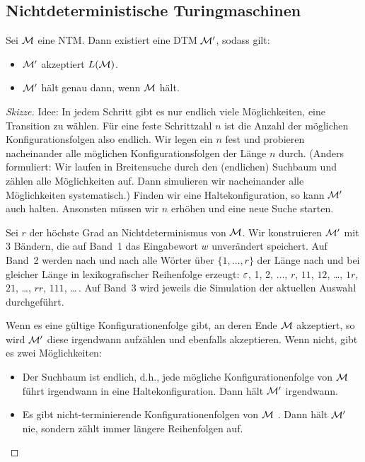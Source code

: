 \subsection{Nichtdeterministische Turingmaschinen}

\begin{Satz}
	Sei $\mathcal{M}$ eine \ac{NTM}.
	Dann existiert eine \ac{DTM} $\mathcal{M}'$, sodass gilt:
	\begin{itemize}
	\item $\mathcal{M}'$ akzeptiert $L(\mathcal{M})$.
	\item $\mathcal{M}'$ hält genau dann, wenn $\mathcal{M}$ hält.
	\qedhere
	\end{itemize}
\end{Satz}

\begin{proof}[Skizze]
Idee: In jedem Schritt gibt es nur endlich viele Möglichkeiten, eine Transition zu wählen.
Für eine feste Schrittzahl $n$ ist die Anzahl der möglichen Konfigurationsfolgen also endlich.
Wir legen ein $n$ fest und probieren nacheinander alle möglichen Konfigurationsfolgen der Länge $n$ durch.
(Anders formuliert: Wir laufen in Breitensuche durch den (endlichen) Suchbaum und zählen alle Möglichkeiten auf.
Dann simulieren wir nacheinander alle Möglichkeiten systematisch.)
Finden wir eine Haltekonfiguration, so kann $\mathcal{M}'$ auch halten.
Ansonsten müssen wir $n$ erhöhen und eine neue Suche starten.

Sei $r$ der höchste Grad an Nichtdeterminismus von $\mathcal{M}$.
Wir konstruieren $\mathcal{M}'$ mit 3 Bändern, die auf Band~1 das Eingabewort $w$ unverändert speichert.
Auf Band~2 werden nach und nach alle Wörter über $\{1, \dots, r\}$ der Länge nach und bei gleicher Länge in lexikografischer Reihenfolge erzeugt: $\varepsilon$, 1, 2, $\dots$, $r$, $11$, $12$, \dots, $1r$, $21$, \dots, $rr$, $111$, \dots\,.
Auf Band~3 wird jeweils die Simulation der aktuellen Auswahl durchgeführt.

Wenn es eine gültige Konfigurationenfolge gibt, an deren Ende $\mathcal{M}$ akzeptiert, so wird $\mathcal{M}'$ diese irgendwann aufzählen und ebenfalls akzeptieren.
Wenn nicht, gibt es zwei Möglichkeiten:
%
\begin{itemize}
 \item Der Suchbaum ist endlich, d.h., jede mögliche Konfigurationenfolge von $\mathcal{M}$ führt irgendwann in eine Haltekonfiguration.
 Dann hält $\mathcal{M}'$ irgendwann.
 \item Es gibt nicht-terminierende Konfigurationenfolgen von $\mathcal{M}$ .
 Dann hält $\mathcal{M}'$ nie, sondern zählt immer längere Reihenfolgen auf.
 \qedhere
\end{itemize}
\end{proof}

